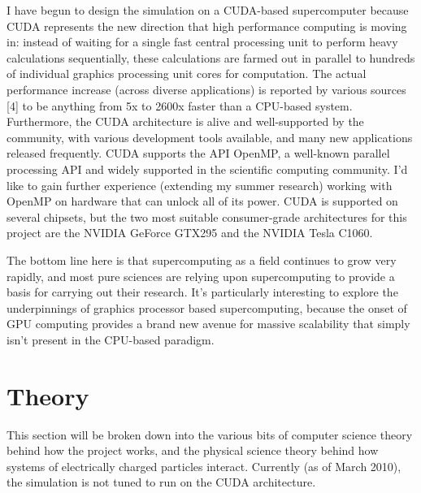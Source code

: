 \documentclass[10pt]{article}
\begin{document}
I have begun to design the simulation on a CUDA-based supercomputer because CUDA represents the new direction that high performance computing is moving in: instead of waiting for a single fast central processing unit to perform heavy calculations sequentially, these calculations are farmed out in parallel to hundreds of individual graphics processing unit cores for computation. The actual performance increase (across diverse applications) is reported by various sources [4] to be anything from 5x to 2600x faster than a CPU-based system. Furthermore, the CUDA architecture is alive and well-supported by the community, with various development tools available, and many new applications released frequently. CUDA supports the API OpenMP, a well-known parallel processing API and widely supported in the scientific computing community. I'd like to gain further experience (extending my summer research) working with OpenMP on hardware that can unlock all of its power. CUDA is supported on several chipsets, but the two most suitable consumer-grade architectures for this project are the NVIDIA GeForce GTX295 and the NVIDIA Tesla C1060. 

The bottom line here is that supercomputing as a field continues to grow very rapidly, and most pure sciences are relying upon supercomputing to provide a basis for carrying out their research. It's particularly interesting to explore the underpinnings of graphics processor based supercomputing, because the onset of GPU computing provides a brand new avenue for massive scalability that simply isn't present in the CPU-based paradigm.

\section{Theory}
This section will be broken down into the various bits of computer science theory behind how the project works, and the physical science theory behind how systems of electrically charged particles interact. Currently (as of March 2010), the simulation is not tuned to run on the CUDA architecture.
\end{document}
